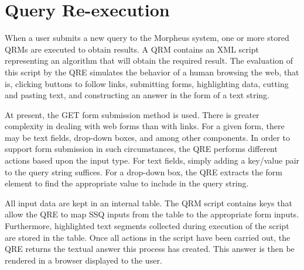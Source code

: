 \section{Query Re-execution}
When a user submits a new query to the Morpheus system, one or more
stored QRMs are executed to obtain results. A QRM contains an XML
script representing an algorithm that will obtain the required result.
The evaluation of this script by the QRE simulates the behavior of a
human browsing the web, that is, clicking buttons to follow links,
submitting forms, highlighting data, cutting and pasting text, and
constructing an answer in the form of a text string.

At present, the GET form submission method is used.  There is greater
complexity in dealing with web forms than with links. For a given
form, there may be text fields, drop-down boxes, and among other components.
In order to support form submission in such circumstances, the QRE performs
different actions based upon the input type. For text fields, simply
adding a key/value pair to the query string suffices. For a drop-down
box, the QRE extracts the form element to find the appropriate value to
include in the query string.

All input data are kept in an internal table. The QRM script contains
keys that allow the QRE to map SSQ inputs from the table to the
appropriate form inputs. Furthermore, highlighted text segments
collected during execution of the script are stored in the table.
Once all actions in the script have been carried out, the QRE returns
the textual answer this process has created. This answer is then be
rendered in a browser displayed to the user.
